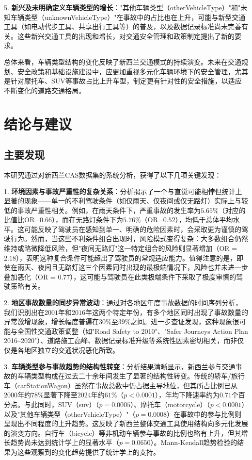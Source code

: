\documentclass[12pt,a4paper]{article}
\begin{document}
5.  \textbf{新兴及未明确定义车辆类型的增长}："其他车辆类型（otherVehicleType）"和"未知车辆类型（unknownVehicleType）"在事故中的占比也在上升，可能与新型交通工具（如电动代步工具、共享出行工具等）的普及，以及数据记录标准尚未完善有关。这些新兴交通工具的出现和增长，对交通安全管理和政策制定提出了新的要求。

总体来看，车辆类型结构的变化反映了新西兰交通模式的持续演变。未来在交通规划、安全政策和基础设施建设中，应更加重视多元化车辆环境下的安全管理，尤其是针对摩托车、SUV等事故占比上升车型，制定更有针对性的安全措施，以适应不断变化的道路交通格局。

\section{结论与建议}

\subsection{主要发现}

本研究通过对新西兰CAS数据集的系统分析，获得了以下几项关键发现：

1.  \textbf{环境因素与事故严重性的复杂关系}：分析揭示了一个与直觉可能相悖但统计上显著的现象——单一的不利驾驶条件（如仅雨天、仅夜间或仅无路灯）实际上与较低的事故严重性相关。例如，在雨天条件下，严重事故的发生率为$5.65\%$（对应的比值比OR=$0.66$），而在无路灯条件下为$5.76\%$（OR=$0.52$），均低于总体平均水平。这可能反映了驾驶员在感知到单一、明确的危险因素时，会采取更为谨慎的驾驶行为。然而，当这些不利条件组合出现时，风险模式变得复杂：大多数组合仍然维持或略微降低风险，但"夜间无路灯"这一特定组合的风险则显著增加（OR = $2.18$），表明这种复合条件可能超出了驾驶员的常规适应能力。值得注意的是，即使在雨天、夜间且无路灯这三个因素同时出现的最极端情况下，风险也并未进一步叠加恶化（OR = $0.77$），这可能与驾驶员在此类极端条件下采取了极度审慎的驾驶策略有关。

2.  \textbf{地区事故数量的同步异常波动}：通过对各地区年度事故数据的时间序列分析，我们识别出在$2001$年和$2016$年这两个特定年份，有多个地区同时出现了事故数量的异常激增现象，增长幅度普遍在$30\%$至$39\%$之间。进一步查证发现，这种现象很可能与全国性交通政策调整（如"Road Safety to 2010"、"Safer Journeys Action Plan 2016–2020"）、道路施工高峰、数据记录标准升级等系统性因素密切相关，而非仅仅是各地区独立的交通状况恶化所致。

3.  \textbf{车辆类型参与事故趋势的结构性转变}：分析结果清晰显示，新西兰参与交通事故的车辆类型构成在过去二十余年间发生了显著的结构性转变。传统的轿车/旅行车（carStationWagon）虽然在事故总数中仍占据主导地位，但其所占比例已从$2000$年约$78\%$显著下降至$2024$年约$61\%$（$p < 0.0001$），年均下降速率约为$0.71$个百分点。与此同时，SUV（suv）（$p = 0.0005$）、摩托车（motorcycle）（$p < 0.0001$）以及"其他车辆类型（otherVehicleType）"（$p = 0.0008$）在事故中的参与比例则呈现出不同程度的上升趋势。这反映了新西兰整体交通工具使用结构向多元化发展的演变方向。自行车（bicycle）等非机动车辆参与事故的比例也略有上升，但其增长趋势尚未达到统计学上的显著水平（$p = 0.0650$）。Mann-Kendall趋势检验的结果为这些观察到的变化趋势提供了统计学上的支持。
\end{document}
